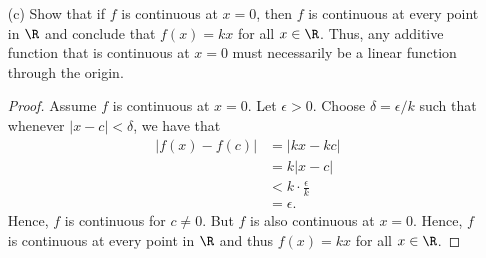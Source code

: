 \begin{enumerate}
\begin{proof}
\begin{align*}
         k &= f(1)  \\
           &= f \Big( \frac{ 1 }{ n } + \frac{ 1 }{ n }  + \dots + \frac{ 1 }{ n }  \Big) \\
           &= n f \Big( \frac{ 1 }{ n }  \Big).
    \end{align*}
    Applying this for any given \( r \in \Q  \), we can see that 
    \begin{align*}
        f(m/n) &= f \Big( \frac{ 1 }{ n } + \frac{ 1 }{ n } + \dots + \frac{ 1 }{ n }  \Big) \\
               &= m f \Big( \frac{ 1 }{ n }  \Big) \\ 
               &= k \Big( \frac{ m }{ n }  \Big). \\
    \end{align*}
    We can prove that this holds for any rational number \( r < 0  \) by using a similar strategy to the used to prove the negative integers case above.
        \end{proof}
    \item[(c)] Show that if \( f \) is continuous at \( x = 0  \), then \( f \) is continuous at every point in \( \R  \) and conclude that \( f(x) = k x  \) for all \( x \in \R  \). Thus, any additive function that is continuous at \( x = 0  \) must necessarily be a linear function through the origin.
        \begin{proof}
        Assume \( f \) is continuous at \( x = 0  \). Let \( \epsilon > 0  \). Choose \( \delta = \epsilon / k  \) such that whenever \( | x - c  | < \delta  \), we have that 
        \begin{align*}
            | f(x) - f(c) | &= | kx - kc  |  \\
                            &= k | x - c  | \\
                            &< k \cdot \frac{ \epsilon  }{  k } \\
                            &= \epsilon.
        \end{align*}
        Hence, \( f  \) is continuous for \( c \neq 0  \). But \( f \) is also continuous at \( x = 0  \). Hence, \( f \) is continuous at every point in \( \R  \) and thus \( f(x) = kx \) for all \( x \in \R  \).
        \end{proof}
\end{enumerate}






































 

